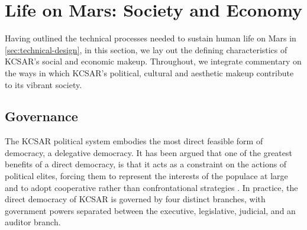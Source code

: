 \documentclass[fleqn,10pt]{Stylesheet} %
\begin{document}





\section{Life on Mars: Society and Economy}
Having outlined the technical processes needed to sustain human life on Mars in \ref{sec:technical-design}, in this section, we lay out the defining characteristics of KCSAR's social and economic makeup. Throughout, we integrate commentary on the ways in which KCSAR's political, cultural and aesthetic makeup contribute to its vibrant society.

\subsection{Governance}
The KCSAR political system embodies the most direct feasible form of democracy, a delegative democracy. It has been argued that one of the greatest benefits of a direct democracy, is that it acts as a constraint on the actions of political elites, forcing them to represent the interests of the populace at large and to adopt cooperative rather than confrontational strategies \cite{Papadopoulos2001}. In practice, the direct democracy of KCSAR is governed by four distinct branches, with government powers separated between the executive, legislative, judicial, and an auditor branch.
\end{document}
